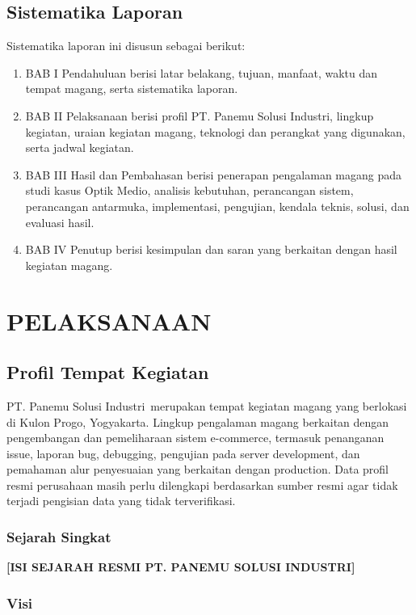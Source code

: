\documentclass[12pt,a4paper,oneside]{report}
\newcommand{\placeholder}[1]{\textbf{[#1]}}
\newcommand{\tempatmagang}{PT. Panemu Solusi Industri}
\newcommand{\lokasimagang}{Kulon Progo, Yogyakarta}
\newcommand{\proyekstudi}{Optik Medio}
\begin{document}
\section{Sistematika Laporan}

Sistematika laporan ini disusun sebagai berikut:

\begin{enumerate}
  \item BAB I Pendahuluan berisi latar belakang, tujuan, manfaat, waktu dan tempat magang, serta sistematika laporan.
  \item BAB II Pelaksanaan berisi profil \tempatmagang, lingkup kegiatan, uraian kegiatan magang, teknologi dan perangkat yang digunakan, serta jadwal kegiatan.
  \item BAB III Hasil dan Pembahasan berisi penerapan pengalaman magang pada studi kasus \proyekstudi, analisis kebutuhan, perancangan sistem, perancangan antarmuka, implementasi, pengujian, kendala teknis, solusi, dan evaluasi hasil.
  \item BAB IV Penutup berisi kesimpulan dan saran yang berkaitan dengan hasil kegiatan magang.
\end{enumerate}

\chapter{PELAKSANAAN}

\section{Profil Tempat Kegiatan}

\tempatmagang\ merupakan tempat kegiatan magang yang berlokasi di \lokasimagang. Lingkup pengalaman magang berkaitan dengan pengembangan dan pemeliharaan sistem e-commerce, termasuk penanganan issue, laporan bug, debugging, pengujian pada server development, dan pemahaman alur penyesuaian yang berkaitan dengan production. Data profil resmi perusahaan masih perlu dilengkapi berdasarkan sumber resmi agar tidak terjadi pengisian data yang tidak terverifikasi.

\subsection{Sejarah Singkat}

\placeholder{ISI SEJARAH RESMI PT. PANEMU SOLUSI INDUSTRI}

\subsection{Visi}
\end{document}
